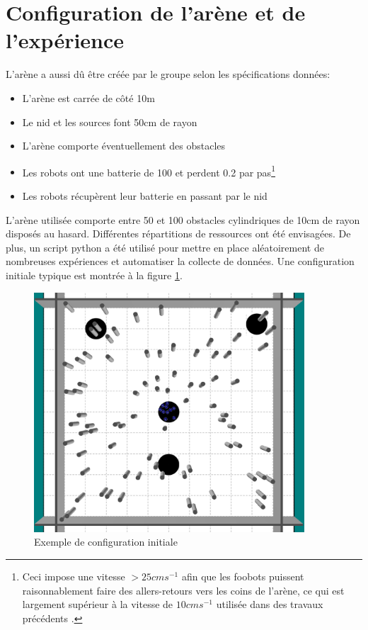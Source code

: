 \section{Configuration de l'arène et de l'expérience}

L'arène a aussi dû être créée par le groupe selon les spécifications données:
\begin{itemize}
  \item L'arène est carrée de côté 10m
  \item Le nid et les sources font 50cm de rayon
  \item L'arène comporte éventuellement des obstacles
  \item Les robots ont une batterie de 100 et perdent 0.2 par pas\footnote{Ceci impose une vitesse $>25cms^{-1}$ afin que les foobots puissent raisonnablement faire des allers-retours vers les coins de l'arène, ce qui est largement supérieur à la vitesse de $10cms^{-1}$ utilisée dans des travaux précédents \cite{foraging, pheromonesForaging}.}
  \item Les robots récupèrent leur batterie en passant par le nid
\end{itemize}

L'arène utilisée comporte entre 50 et 100 obstacles cylindriques de 10cm de rayon disposés au hasard. Différentes répartitions de ressources ont été envisagées. De plus, un script python a été utilisé pour mettre en place aléatoirement de nombreuses expériences et automatiser la collecte de données. Une configuration initiale typique est montrée à la figure \ref{fig:initArena}.
\begin{figure}[htb]
  \centering
  \includegraphics[width=0.9\textwidth]{pics/initArena.png}
  \caption{Exemple de configuration initiale\label{fig:initArena}}
\end{figure}


